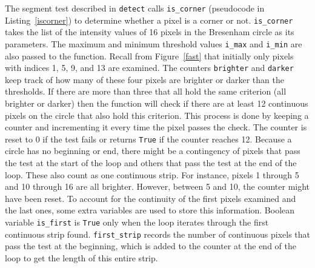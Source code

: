 The segment test described in \texttt{detect} calls \texttt{is\_corner} (pseudocode in Listing~\ref{iscorner}) to determine whether a pixel is a corner or not. \texttt{is\_corner} takes the list of the intensity values of 16 pixels in the Bresenham circle as its parameters.  The maximum and minimum threshold values \texttt{i\_max} and \texttt{i\_min} are also passed to the function. Recall from Figure~\ref{fast} that initially only pixels with indices 1, 5, 9, and 13 are examined. The counters \texttt{brighter} and \texttt{darker} keep track of how many of these four pixels are brighter or darker than the thresholds. If there are more than three that all hold the same criterion (all brighter or darker) then the function will check if there are at least 12 continuous pixels on the circle that also hold this criterion. This process is done by keeping a counter and incrementing it every time the pixel passes the check. The counter is reset to 0 if the test fails or returns \texttt{True} if the counter reaches 12. Because a circle has no beginning or end, there might be a contingency of pixels that pass the test at the start of the loop and others that pass the test at the end of the loop. These also count as one continuous strip. For instance, pixels 1 through 5 and 10 through 16 are all brighter. However, between 5 and 10, the counter might have been reset. To account for the continuity of the first pixels examined and the last ones, some extra variables are used to store this information. Boolean variable \texttt{is\_first} is \texttt{True} only when the loop iterates through the first continuous strip found. \texttt{first\_strip} records the number of continuous pixels that pass the test at the beginning, which is added to the counter at the end of the loop to get the length of this entire strip.

